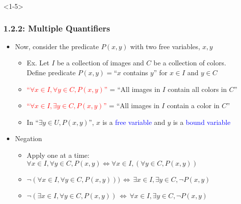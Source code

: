 \documentclass[10pt,english,aspectratio=169]{beamer}
\begin{document}
\begin{frame}<1-5> \frametitle{1.2.2: Multiple Quantifiers}



\begin{itemize}
\setlength\itemsep{6mm}
\item<1-> Now, consider the predicate $P(x,y)$ with two free variables, $x,y$ \vspace{1mm}
\begin{itemize}
 \setlength\itemsep{1.5mm}
 \item Ex. Let $I$ be a collection of images and $C$ be a collection of colors. \\ Define predicate $P(x,y)=$``$x$ contains $y$'' for $x\in I$ and $y\in C$ 
 \item<2-> \textcolor{red}{``$\forall x\!\in\! I, \forall y\!\in\! C, P(x,y)$''} = ``All images in $I$ contain all colors in $C$''
 \item<3-> \textcolor{red}{``$\forall x\!\in\! I, \exists y \!\in\! C, P(x,y)$''} = ``All images in $I$ contain a color in $C$''
 \item<4-> In ``$\exists y \in U, P(x,y)$'', $x$ is a \textcolor{blue}{free variable} and $y$ is a \textcolor{blue}{bound variable}
\end{itemize}

\item<5-> Negation \vspace{1mm}
\begin{itemize}
 \setlength\itemsep{1.5mm}
 \item Apply one at a time: $\forall x\!\in\! I, \forall y\!\in\! C, P(x,y) \Leftrightarrow \forall x\!\in\! I, \left(\forall y\!\in\! C, P(x,y)\right)$
 \item $\neg (\forall x\!\in\! I, \forall y\!\in\! C, P(x,y))) \,\Leftrightarrow\, \exists x\!\in\! I, \exists y\!\in\! C, \neg P(x,y)$
 \item $\neg (\exists x\!\in\! I, \forall y\!\in\! C, P(x,y)) \,\Leftrightarrow\, \forall x\!\in\! I, \exists y\!\in\! C, \neg P(x,y)$
\end{itemize}  

\end{itemize}



\end{frame}
\end{document}
